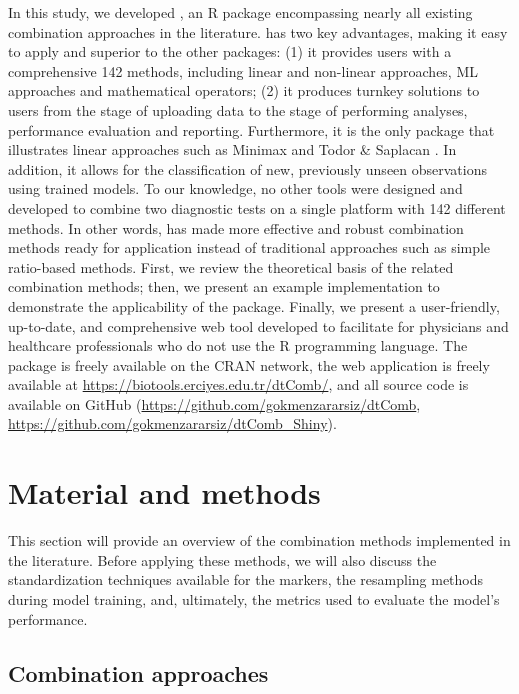 In this study, we developed , an R package encompassing nearly all existing combination approaches in the literature.  has two key advantages, making it easy to apply and superior to the other packages: (1) it provides users with a comprehensive 142 methods, including linear and non-linear approaches, ML approaches and mathematical operators; (2) it produces turnkey solutions to users from the stage of uploading data to the stage of performing analyses, performance evaluation and reporting. Furthermore, it is the only package that illustrates linear approaches such as Minimax and Todor \& Saplacan \citep{sameera2016binary, todor2014tools}. In addition, it allows for the classification of new, previously unseen observations using trained models. To our knowledge, no other tools were designed and developed to combine two diagnostic tests on a single platform with 142 different methods. In other words,  has made more effective and robust combination methods ready for application instead of traditional approaches such as simple ratio-based methods. First, we review the theoretical basis of the related combination methods; then, we present an example implementation to demonstrate the applicability of the package. Finally, we present a user-friendly, up-to-date, and comprehensive web tool developed to facilitate  for physicians and healthcare professionals who do not use the R programming language. The  package is freely available on the CRAN network, the web application is freely available at \url{https://biotools.erciyes.edu.tr/dtComb/}, and all source code is available on GitHub (\url{https://github.com/gokmenzararsiz/dtComb}, \url{https://github.com/gokmenzararsiz/dtComb_Shiny}).

\section{Material and methods}\label{material-and-methods}

This section will provide an overview of the combination methods implemented in the literature. Before applying these methods, we will also discuss the standardization techniques available for the markers, the resampling methods during model training, and, ultimately, the metrics used to evaluate the model's performance.

\subsection{Combination approaches}\label{combination-approaches}

